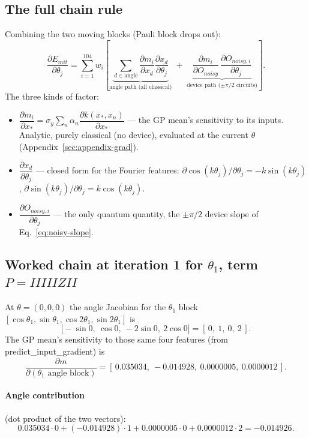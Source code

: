 \documentclass[11pt]{article}
\def\bm#1{#1}%
\def\texttt#1{#1}%
\def\mathrm#1{#1}%
\newcommand{\Emit}{E_{\mathrm{mit}}}
\begin{document}
\subsection{The full chain rule}
Combining the two moving blocks (Pauli block drops out):
\begin{equation}
\frac{\partial\Emit}{\partial\theta_j}
=\sum_{i=1}^{104} w_i\!\left[
\underbrace{\sum_{d\in\text{angle}}\frac{\partial m_i}{\partial x_d}\frac{\partial x_d}{\partial\theta_j}}_{\text{angle path (all classical)}}
\;+\;
\underbrace{\frac{\partial m_i}{\partial O_{\mathrm{noisy}}}\,\frac{\partial O_{\mathrm{noisy},i}}{\partial\theta_j}}_{\text{device path ($\pm\pi/2$ circuits)}}
\right].
\label{eq:grad}
\end{equation}
The three kinds of factor:
\begin{itemize}
  \item $\dfrac{\partial m_i}{\partial \bm x_*}=\sigma_y\sum_n\alpha_n\dfrac{\partial k(\bm x_*,\bm x_n)}{\partial \bm x_*}$
        --- the GP mean's sensitivity to its inputs. Analytic, purely classical
        (no device), evaluated at the current $\bm\theta$
        (Appendix~\ref{sec:appendix-grad}).
  \item $\dfrac{\partial x_d}{\partial\theta_j}$ --- closed form for the Fourier
        features: $\partial\cos(k\theta_j)/\partial\theta_j=-k\sin(k\theta_j)$,
        $\partial\sin(k\theta_j)/\partial\theta_j=k\cos(k\theta_j)$.
  \item $\dfrac{\partial O_{\mathrm{noisy},i}}{\partial\theta_j}$ --- the only
        quantum quantity, the $\pm\pi/2$ device slope of
        Eq.~\eqref{eq:noisy-slope}.
\end{itemize}

\subsection{Worked chain at iteration 1 for \texorpdfstring{$\theta_1$}{theta1}, term \texorpdfstring{$P=\texttt{IIIIIZII}$}{P=IIIIIZII}}
At $\bm\theta=(0,0,0)$ the angle Jacobian for the $\theta_1$ block
$[\cos\theta_1,\sin\theta_1,\cos2\theta_1,\sin2\theta_1]$ is
\[
\Big[-\sin 0,\ \cos 0,\ -2\sin 0,\ 2\cos 0\Big]=[\,0,\ 1,\ 0,\ 2\,].
\]
The GP mean's sensitivity to those same four features (from
\texttt{predict\_input\_gradient}) is
\[
\frac{\partial m}{\partial(\text{$\theta_1$ angle block})}=[\,0.035034,\ -0.014928,\ 0.0000005,\ 0.0000012\,].
\]
\paragraph{Angle contribution} (dot product of the two vectors):
\[
0.035034\cdot 0 + (-0.014928)\cdot 1 + 0.0000005\cdot 0 + 0.0000012\cdot 2 = -0.014926.
\]
\end{document}
